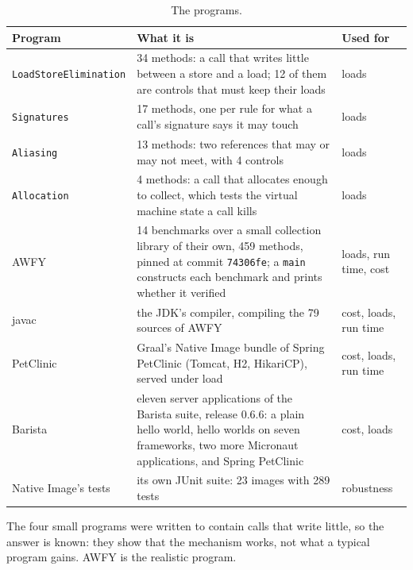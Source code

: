 \begin{table}[t]
    \centering
    \caption{The programs.}
    \label{tab:eval-programs}
    \footnotesize
    \begin{tabular}{p{3.0cm}p{6.8cm}p{2.5cm}}
        \toprule
        Program & What it is & Used for \\
        \midrule
        \texttt{LoadStoreElimination}   & 34 methods: a call that writes little between a store and a load; 12 of them are controls that must keep their loads & loads \\
        \texttt{Signatures} & 17 methods, one per rule for what a call's signature says it may touch & loads \\
        \texttt{Aliasing}   & 13 methods: two references that may or may not meet, with 4 controls & loads \\
        \texttt{Allocation} & 4 methods: a call that allocates enough to collect, which tests the virtual machine state a call kills & loads \\
        AWFY                & 14 benchmarks over a small collection library of their own, 459 methods, pinned at commit \texttt{74306fe}; a \texttt{main} constructs each benchmark and prints whether it verified & loads, run time, cost \\
        javac               & the JDK's compiler, compiling the 79 sources of AWFY & cost, loads, run time \\
        PetClinic           & Graal's Native Image bundle of Spring PetClinic (Tomcat, H2, HikariCP), served under load & cost, loads, run time \\
        Barista             & eleven server applications of the Barista suite, release 0.6.6: a plain hello world, hello worlds on seven frameworks, two more Micronaut applications, and Spring PetClinic & cost, loads \\
        Native Image's tests & its own JUnit suite: 23 images with 289 tests & robustness \\
        \bottomrule
    \end{tabular}
\end{table}

The four small programs were written to contain calls that write little, so the answer is known: they show that the
mechanism works, not what a typical program gains. AWFY is the realistic program.

